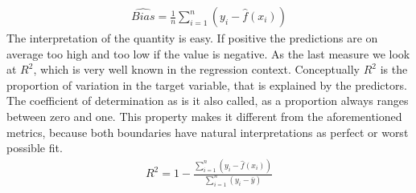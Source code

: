\begin{align}
\hat{Bias}=\frac{1}{n}\sum_{i=1}^n(y_i-\hat{f}(x_i))
\end{align}
The interpretation of the quantity is easy. If positive the predictions are on average too high and too low if the value is negative. As the last measure we look at $R^2$, which is very well known in the regression context. Conceptually $R^2$ is the proportion of variation in the target variable, that is explained by the predictors. The coefficient of determination as is it also called, as a proportion always ranges between zero and one. This property makes it different from the aforementioned metrics, because both boundaries have natural interpretations as perfect or worst possible fit.
\begin{align}
R^2=1-\frac{\sum_{i=1}^n(y_i-\hat{f}(x_i))}{\sum_{i=1}^n(y_i-\bar{y})}
\end{align}  